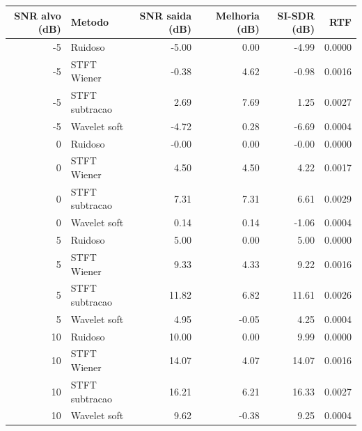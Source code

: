 \begin{tabular}{rlrrrr}
\toprule
SNR alvo (dB) & Metodo & SNR saida (dB) & Melhoria (dB) & SI-SDR (dB) & RTF \\
\midrule
-5 & Ruidoso & -5.00 & 0.00 & -4.99 & 0.0000 \\
-5 & STFT Wiener & -0.38 & 4.62 & -0.98 & 0.0016 \\
-5 & STFT subtracao & 2.69 & 7.69 & 1.25 & 0.0027 \\
-5 & Wavelet soft & -4.72 & 0.28 & -6.69 & 0.0004 \\
0 & Ruidoso & -0.00 & 0.00 & -0.00 & 0.0000 \\
0 & STFT Wiener & 4.50 & 4.50 & 4.22 & 0.0017 \\
0 & STFT subtracao & 7.31 & 7.31 & 6.61 & 0.0029 \\
0 & Wavelet soft & 0.14 & 0.14 & -1.06 & 0.0004 \\
5 & Ruidoso & 5.00 & 0.00 & 5.00 & 0.0000 \\
5 & STFT Wiener & 9.33 & 4.33 & 9.22 & 0.0016 \\
5 & STFT subtracao & 11.82 & 6.82 & 11.61 & 0.0026 \\
5 & Wavelet soft & 4.95 & -0.05 & 4.25 & 0.0004 \\
10 & Ruidoso & 10.00 & 0.00 & 9.99 & 0.0000 \\
10 & STFT Wiener & 14.07 & 4.07 & 14.07 & 0.0016 \\
10 & STFT subtracao & 16.21 & 6.21 & 16.33 & 0.0027 \\
10 & Wavelet soft & 9.62 & -0.38 & 9.25 & 0.0004 \\
\bottomrule
\end{tabular}

